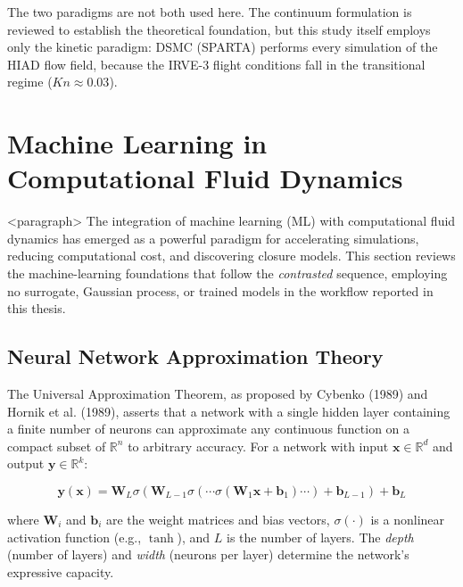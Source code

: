 \noindent The two paradigms are not both used here. The continuum formulation is reviewed to establish the theoretical foundation, but this study itself employs only the kinetic paradigm: DSMC (SPARTA) performs every simulation of the HIAD flow field, because the IRVE-3 flight conditions fall in the transitional regime ($Kn \approx 0.03$).

\section{Machine Learning in Computational Fluid Dynamics}

<paragraph> The integration of machine learning (ML) with computational fluid dynamics has emerged as a powerful paradigm for accelerating simulations, reducing computational cost, and discovering closure models. This section reviews the machine-learning foundations that follow the \emph{contrasted} sequence, employing no surrogate, Gaussian process, or trained models in the workflow reported in this thesis.

\subsection{Neural Network Approximation Theory}

The Universal Approximation Theorem, as proposed by Cybenko (1989) and Hornik et al. (1989), asserts that a network with a single hidden layer containing a finite number of neurons can approximate any continuous function on a compact subset of $\mathbb{R}^n$ to arbitrary accuracy. For a network with input $\mathbf{x} \in \mathbb{R}^d$ and output $\mathbf{y} \in \mathbb{R}^k$:

\begin{equation}
    \mathbf{y}(\mathbf{x}) = \mathbf{W}_L \sigma(\mathbf{W}_{L-1} \sigma(\cdots \sigma(\mathbf{W}_1 \mathbf{x} + \mathbf{b}_1) \cdots) + \mathbf{b}_{L-1}) + \mathbf{b}_L
    \label{eq:neural_network}
\end{equation}

\noindent where $\mathbf{W}_i$ and $\mathbf{b}_i$ are the weight matrices and bias vectors, $\sigma(\cdot)$ is a nonlinear activation function (e.g., $\tanh$), and $L$ is the number of layers. The \textit{depth} (number of layers) and \textit{width} (neurons per layer) determine the network's expressive capacity.


